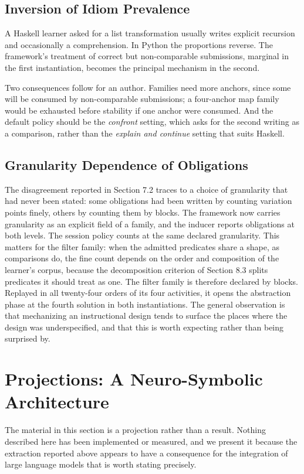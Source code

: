 \documentclass[10pt,twocolumn,letterpaper]{article}
\begin{document}
\subsection{Inversion of Idiom Prevalence}
A Haskell learner asked for a list transformation usually writes
explicit recursion and occasionally a comprehension. In Python the
proportions reverse. The framework's treatment of correct but
non-comparable submissions, marginal in the first instantiation, becomes
the principal mechanism in the second.

Two consequences follow for an author. Families need more anchors, since
some will be consumed by non-comparable submissions; a four-anchor
map family would be exhausted before stability if one anchor were
consumed. And the default policy should be the \emph{confront}
setting, which asks for the second writing as a comparison, rather than
the \emph{explain and continue} setting that suits Haskell.

\subsection{Granularity Dependence of Obligations}
The disagreement reported in Section 7.2 traces to a choice of granularity
that had never been stated: some obligations had been written by counting
variation points finely, others by counting them by blocks. The framework
now carries granularity as an explicit field of a
family, and the inducer reports obligations at both levels. The session
policy counts at the same declared granularity. This matters for the filter
family: when the admitted predicates share a shape, as comparisons do, the
fine count depends on the order and composition of the learner's corpus,
because the decomposition criterion of Section 8.3 splits predicates it
should treat as one. The filter family is therefore declared by blocks.
Replayed in all twenty-four orders of its four activities, it opens the
abstraction phase at the fourth solution in both instantiations. The general
observation is that mechanizing an instructional design tends to surface
the places where the design was underspecified, and that this is worth
expecting rather than being surprised by.

\section{Projections: A Neuro-Symbolic Architecture}
The material in this section is a projection rather than a result. Nothing described here has been implemented or measured, and we present it because the extraction reported above appears to have a consequence for the integration of large language models that is worth stating precisely.
\end{document}
